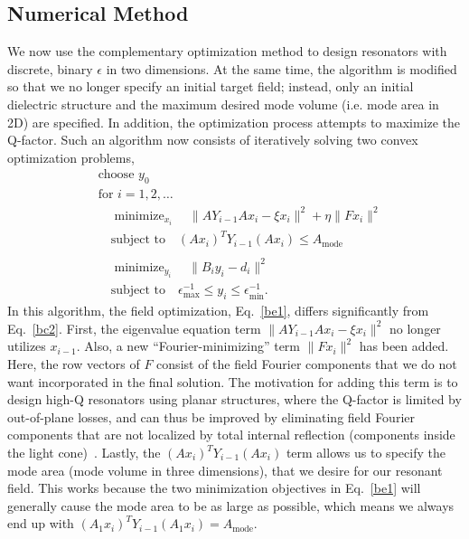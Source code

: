 \documentclass[10pt,letterpaper]{article}
\DeclareMathOperator*{\minimize}{minimize}
\begin{document}
\subsection{Numerical Method}\label{sec:2Dnum}
We now use the complementary optimization method to design resonators with discrete, binary $\epsilon$ in two dimensions. At the same time, the algorithm is modified so that we no longer specify an initial target field; instead, only an initial dielectric structure and the maximum desired mode volume (i.e. mode area in 2D) are specified. In addition, the optimization process attempts to maximize the Q-factor. Such an algorithm now consists of iteratively solving two convex optimization problems,
\begin{align}
&\text{choose $y_0$} \nonumber \\
&\text{for } i = 1, 2, \ldots \nonumber \\
&\quad\minimize_{x_i}\quad \|A Y_{i-1} A x_i - \xi x_{i}\|^2 +   \eta \|F x_i\|^2\nonumber \\
&\quad\text{subject to}\quad (A x_i)^T Y_{i-1} (A x_i) \leq A_\text{mode} \label{be1} \\
\nonumber \\
&\quad\minimize_{y_i}\quad \|B_i y_i-d_i\|^2 \nonumber \\
&\quad\text{subject to}\quad \epsilon_\text{max}^{-1} \leq y_i \leq \epsilon_\text{min}^{-1}. \label{be2} 
\end{align}
In this algorithm, the field optimization, Eq.~\eqref{be1}, differs significantly from Eq.~\eqref{bc2}. First, the eigenvalue equation term $\|A Y_{i-1} A x_i - \xi x_{i}\|^2$ no longer utilizes $x_{i-1}$. Also, a new ``Fourier-minimizing'' term $\|F x_i\|^2$ has been added. Here, the row vectors of $F$ consist of the field Fourier components that we do not want incorporated in the final solution. The motivation for adding this term is to design high-Q resonators using planar structures, where the Q-factor is limited by out-of-plane losses, and can thus be improved by eliminating field Fourier components that are not localized by total internal reflection (components inside the light cone)~\cite{Vuc05}. Lastly, the $(A x_i)^T Y_{i-1} (A x_i)$ term allows us to specify the mode area (mode volume in three dimensions), that we desire for our resonant field. This works because the two minimization objectives in Eq.~\eqref{be1} will generally cause the mode area to be as large as possible, which means we always end up with $(A_1 x_i)^T Y_{i-1} (A_1 x_i) = A_\text{mode}$.
\end{document}
